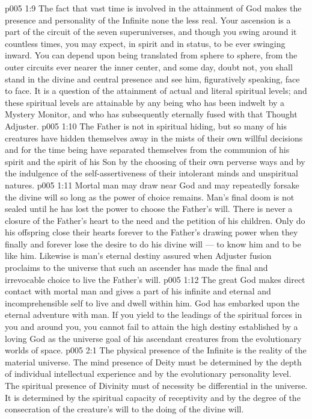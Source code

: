 \vs p005 1:9 The fact that vast time is involved in the attainment of God makes the presence and personality of the Infinite none the less real. Your ascension is a part of the circuit of the seven superuniverses, and though you swing around it countless times, you may expect, in spirit and in status, to be ever swinging inward. You can depend upon being translated from sphere to sphere, from the outer circuits ever nearer the inner center, and some day, doubt not, you shall stand in the divine and central presence and see him, figuratively speaking, face to face. It is a question of the attainment of actual and literal spiritual levels; and these spiritual levels are attainable by any being who has been indwelt by a Mystery Monitor, and who has subsequently eternally fused with that Thought Adjuster.
\vs p005 1:10 \pc The Father is not in spiritual hiding, but so many of his creatures have hidden themselves away in the mists of their own willful decisions and for the time being have separated themselves from the communion of his spirit and the spirit of his Son by the choosing of their own perverse ways and by the indulgence of the self\hyp{}assertiveness of their intolerant minds and unspiritual natures.
\vs p005 1:11 Mortal man may draw near God and may repeatedly forsake the divine will so long as the power of choice remains. Man’s final doom is not sealed until he has lost the power to choose the Father’s will. There is never a closure of the Father’s heart to the need and the petition of his children. Only do his offspring close their hearts forever to the Father’s drawing power when they finally and forever lose the desire to do his divine will --- to know him and to be like him. Likewise is man’s eternal destiny assured when Adjuster fusion proclaims to the universe that such an ascender has made the final and irrevocable choice to live the Father’s will.
\vs p005 1:12 The great God makes direct contact with mortal man and gives a part of his infinite and eternal and incomprehensible self to live and dwell within him. God has embarked upon the eternal adventure with man. If you yield to the leadings of the spiritual forces in you and around you, you cannot fail to attain the high destiny established by a loving God as the universe goal of his ascendant creatures from the evolutionary worlds of space.
\vs p005 2:1 The physical presence of the Infinite is the reality of the material universe. The mind presence of Deity must be determined by the depth of individual intellectual experience and by the evolutionary personality level. The spiritual presence of Divinity must of necessity be differential in the universe. It is determined by the spiritual capacity of receptivity and by the degree of the consecration of the creature’s will to the doing of the divine will.
